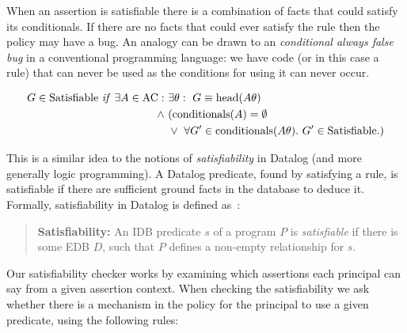 \documentclass[thesis.tex]{subfiles}
\begin{document}
When an assertion is satisfiable there is a combination of facts that could
satisfy its conditionals. If there are no facts that could ever satisfy the rule
then the policy may have a bug. An analogy can be drawn to an \emph{conditional
always false bug} in a conventional programming language: we have code (or in
this case a rule) that can never be used as the conditions for using it can
never occur.

\begin{align*}
  G \in \text{Satisfiable}~\text{\textit{if}}~\exists A \in \text{AC}:~&\exists \theta:~G\equiv\text{head}(A\theta) \\
                                                              \wedge~ & (\text{conditionals}(A) = \emptyset \\
                                                                      & \vee~\forall G^\prime \in \text{conditionals}(A\theta).~G^\prime \in \text{Satisfiable}.)
\end{align*}

This is a similar idea to the notions of \emph{satisfiability} in Datalog (and
more generally logic programming). A Datalog predicate, found by satisfying a
rule, is satisfiable if there are sufficient ground facts in the database to
deduce it. Formally, satisfiability in Datalog is defined
as~\cite{alon_levy_equivalence_1993}:

\begin{quote}
  \textbf{Satisfiability:} An IDB predicate $s$ of a program $P$ is
  \emph{satisfiable} if there is some EDB $D$, such that $P$ defines a
  non-empty relationship for $s$.
\end{quote}

Our satisfiability checker works by examining which assertions each principal can say from a given assertion context.
When checking the satisfiability we ask whether there is a mechanism in the policy for the principal to use a given predicate, using the following rules:
\end{document}
